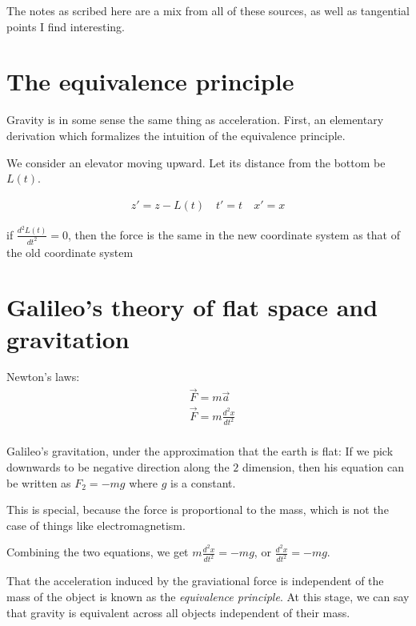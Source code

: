 \documentclass[11pt]{book}
\begin{document}
The notes as scribed here are a mix from all of these sources, as well
as tangential points I find interesting.

\section{The equivalence principle}

Gravity is in some sense the same thing as acceleration. First, an elementary
derivation which formalizes the intuition of the equivalence principle.

We consider an elevator moving upward. Let its distance from the bottom be $L(t)$.

\begin{align*}
    z' = z - L(t) \quad t' = t \quad x' = x
\end{align*}



if $\frac{d^2 L(t)}{dt^2} = 0$, then the force is the same in the new coordinate
system as that of the old coordinate system

\section{Galileo's theory of flat space and gravitation}
Newton's laws:
\begin{align*}
    &\vec F = m \vec a \\
    &\vec F = m \frac{d^2 x}{dt^2} \\
\end{align*}

Galileo's gravitation, under the approximation that the earth is flat:
If we pick downwards to be negative direction along the $2$ dimension, then his
equation can be written as ${F_2 = - m g}$ where $g$ is a constant.

This is special, because the force is proportional to the mass, which is not
the case of things like electromagnetism.


Combining the two equations, we get ${m \frac{d^2x}{dt^2} = - m g}$, or
${\frac{d^2x}{dt^2} = - m g}$.


That the acceleration induced by the graviational force is independent of the
mass of the object is known as the \textit{equivalence principle}. At this
stage, we can say that gravity is equivalent across all objects independent of
their mass.
\end{document}
